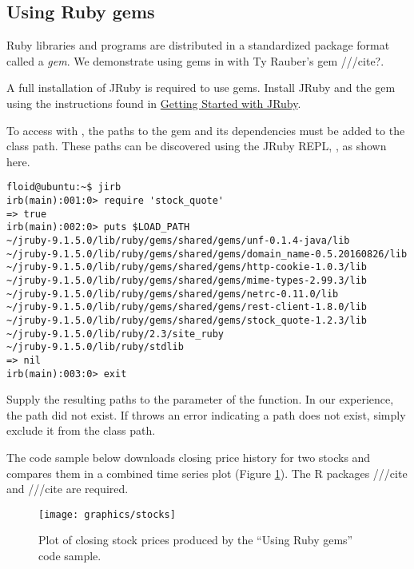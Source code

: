 \subsection{Using Ruby gems}

Ruby libraries and programs are distributed in a standardized package format called a \textit{gem}. We demonstrate using gems in with Ty Rauber's \href{https://github.com/tyrauber/stock_quote}{} gem ///cite?. 

A full installation of JRuby is required to use gems. Install JRuby and the  gem using the instructions found in \href{https://github.com/jruby/jruby/wiki/GettingStarted}{Getting Started with JRuby}.%

To access  with , the paths to the gem and its dependencies must be added to the  class path. These paths can be discovered using the JRuby REPL, , as shown here.

\begin{verbatim}
floid@ubuntu:~$ jirb
irb(main):001:0> require 'stock_quote'
=> true
irb(main):002:0> puts $LOAD_PATH
~/jruby-9.1.5.0/lib/ruby/gems/shared/gems/unf-0.1.4-java/lib
~/jruby-9.1.5.0/lib/ruby/gems/shared/gems/domain_name-0.5.20160826/lib
~/jruby-9.1.5.0/lib/ruby/gems/shared/gems/http-cookie-1.0.3/lib
~/jruby-9.1.5.0/lib/ruby/gems/shared/gems/mime-types-2.99.3/lib
~/jruby-9.1.5.0/lib/ruby/gems/shared/gems/netrc-0.11.0/lib
~/jruby-9.1.5.0/lib/ruby/gems/shared/gems/rest-client-1.8.0/lib
~/jruby-9.1.5.0/lib/ruby/gems/shared/gems/stock_quote-1.2.3/lib
~/jruby-9.1.5.0/lib/ruby/2.3/site_ruby
~/jruby-9.1.5.0/lib/ruby/stdlib
=> nil
irb(main):003:0> exit
\end{verbatim}

Supply the resulting paths to the  parameter of the   function. In our experience, the  path did not exist. If  throws an error indicating a path does not exist, simply exclude it from the class path.

The code sample below downloads closing price history for two stocks and compares them in a combined time series plot (Figure \ref{fig:stocks}). The R packages  ///cite and  ///cite are required. %

\begin{figure}[h]
\centering
\texttt{[image: graphics/stocks]}
\caption{Plot of closing stock prices produced by the “Using Ruby gems” code sample.}
\label{fig:stocks}
\end{figure}

